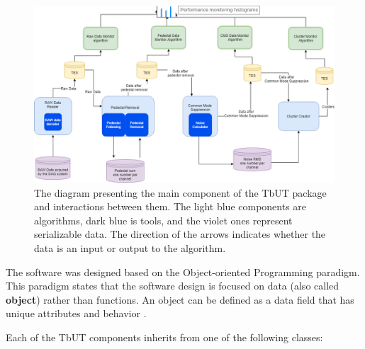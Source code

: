 \begin{figure}[h]
\centering
\includegraphics{figures/TBUT.png}
\caption{The diagram presenting the main component of the TbUT package and interactions between them. The light blue components are algorithms, dark blue is tools, and the violet ones represent serializable data. The direction of the arrows indicates whether the data is an input or output to the algorithm. }
\label{fig:TbUT}
\end{figure}


The software was designed based on the Object-oriented Programming paradigm.   This paradigm states that the software design is focused on data (also called \textbf{object}) rather than functions. An object can be defined as a data field that has unique attributes and behavior \cite{programming_paradigma}. 

Each of the TbUT components inherits from one of the following classes:  

